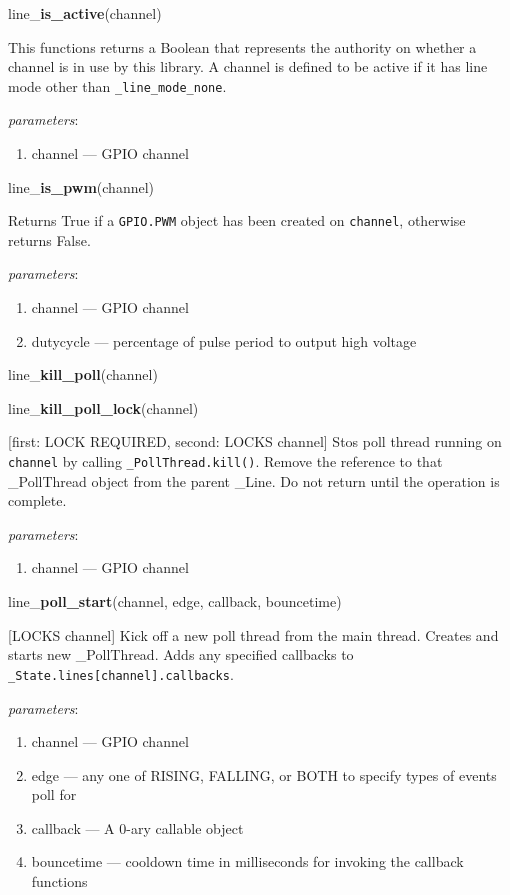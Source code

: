\documentclass[12pt]{article}
\begin{document}
\noindent line\_\textbf{is\_active}(channel)

This functions returns a Boolean that represents the authority on whether a channel is in use by this library. A channel is defined to be active if it has line mode other than \texttt{\_line\_mode\_none}.

\textit{parameters}:
\begin{enumerate}      
        \item channel --- GPIO channel
\end{enumerate}

\noindent line\_\textbf{is\_pwm}(channel)

Returns True if a \texttt{GPIO.PWM} object has been created on \texttt{channel}, otherwise returns False.

\textit{parameters}:
\begin{enumerate}      
        \item channel --- GPIO channel
        \item dutycycle --- percentage of pulse period to output high voltage
\end{enumerate}

\noindent line\_\textbf{kill\_poll}(channel)

\noindent line\_\textbf{kill\_poll\_lock}(channel)

[first: LOCK REQUIRED, second: LOCKS channel]
Stos poll thread running on \texttt{channel} by calling \texttt{\_PollThread.kill()}. Remove the reference to that \_PollThread object from the parent \_Line. Do not return until the operation is complete.


\textit{parameters}:
\begin{enumerate}      
        \item channel --- GPIO channel
\end{enumerate}

\noindent line\_\textbf{poll\_start}(channel, edge, callback, bouncetime)

[LOCKS channel] Kick off a new poll thread from the main thread.
Creates and starts new \_PollThread. Adds any specified callbacks to \texttt{\_State.lines[channel].callbacks}. 

\textit{parameters}:
\begin{enumerate}      
        \item channel --- GPIO channel
        \item edge --- any one of RISING, FALLING, or BOTH to specify types of events poll for
        \item callback --- A 0-ary callable object
        \item bouncetime --- cooldown time in milliseconds for invoking the callback functions
\end{enumerate}
\end{document}
